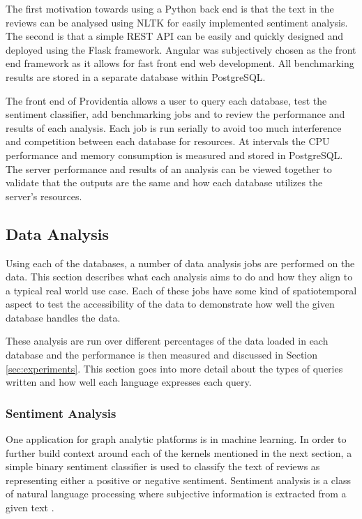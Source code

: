 The first motivation towards using a Python back end is that the text in the reviews can be analysed using NLTK for easily implemented sentiment analysis. The second is that a simple REST API can be easily and quickly designed and deployed using the Flask framework. Angular was subjectively chosen as the front end framework as it allows for fast front end web development. All benchmarking results are stored in a separate database within PostgreSQL.

The front end of Providentia allows a user to query each database, test the sentiment classifier, add benchmarking jobs and to review the performance and results of each analysis. Each job is run serially to avoid too much interference and competition between each database for resources. At intervals the CPU performance and memory consumption is measured and stored in PostgreSQL. The server performance and results of an analysis can be viewed together to validate that the outputs are the same and how each database utilizes the server's resources.

\subsection{Data Analysis}
Using each of the databases, a number of data analysis jobs are performed on the data. This section describes what each analysis aims to do and how they align to a typical real world use case. Each of these jobs have some kind of spatiotemporal aspect to test the accessibility of the data to demonstrate how well the given database handles the data.

These analysis are run over different percentages of the data loaded in each database and the performance is then measured and discussed in Section \ref{sec:experiments}. This section goes into more detail about the types of queries written and how well each language expresses each
query.

\subsubsection{Sentiment Analysis}
One application for graph analytic platforms is in machine learning. In order to further build context around each of the kernels mentioned in the next section, a simple binary sentiment classifier is used to classify the text of reviews as representing either a positive or negative sentiment. Sentiment analysis is a class of natural language processing where subjective information is extracted from a given text \cite{sentiment-analysis-gupta}.

